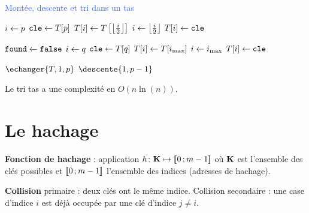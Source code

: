 \documentclass[a4paper,11pt,twocolumn]{article}
\begin{document}
	\begin{algorithm}[h]
	\caption{\textcolor{RoyalBlue}{Montée, descente et tri dans un tas}}

	{
		$i \leftarrow p$ \;
		$\texttt{cle} \leftarrow T[p]$ \;
		{
			$T[i] \leftarrow T \left[ \left\lfloor \frac{i}{2} \right\rfloor \right]$ \;
			$i \leftarrow \left\lfloor \frac{i}{2} \right\rfloor$ \;
		}
		$T[i] \leftarrow \texttt{cle}$ \;
	}

	{
		$\texttt{found} \leftarrow \texttt{false}$ \;
		$i \leftarrow q$ \;
		$\texttt{cle} \leftarrow T[q]$ \;
		{
			\Sinon
			{
			}
			{
				$T[i] \leftarrow T[i_{\max}]$ \;
				$i \leftarrow i_{\max}$ \;
			}
		}
		$T[i] \leftarrow \texttt{cle}$ \;
	}

	{
		{
			$\echanger{T,1,p}$ \;
			$\descente{1,p - 1}$ \;
		}
	}
	\end{algorithm}

	\begin{pop}
	Le tri tas a une complexité en $O(n\ln(n))$.
	\end{pop}


\section{Le hachage}

	\begin{defn}
	\textbf{Fonction de hachage} : application $h \colon \mathbf{K} \mapsto \mathopen{}\mathclose{\left[\![0\mathclose{}\mathpunct{};m - 1\right]\!]}$ où $\mathbf{K}$ est l'ensemble des clés possibles et $\mathopen{}\mathclose{\left[\![0\mathclose{}\mathpunct{};m - 1\right]\!]}$ l'ensemble des indices (adresses de hachage).
	\end{defn}

	\begin{defn}
	\textbf{Collision} primaire : deux clés ont le même indice.
	Collision secondaire : une case d'indice $i$ est déjà occupée par une clé d'indice $j \neq i$.
	\end{defn}
\end{document}
